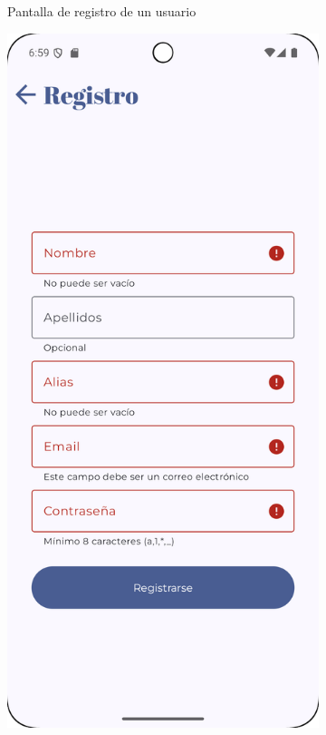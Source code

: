 \begin{figure}[H]
\begin{subfigure}[b]{0.3\textwidth}
      \caption{Pantalla de registro de un usuario}
      \label{fig:register-main}
    \end{subfigure}
    \hfill
    \begin{subfigure}[b]{0.3\textwidth}
      \includegraphics[width=\textwidth]{./img/manual/pinche_register_empty.png}

\end{subfigure}
\end{figure}
